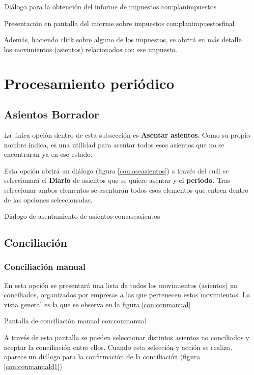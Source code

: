 {Diálogo para la obtención del informe de impuestos}
{con:planimpuestos}

{Presentación en pantalla del informe sobre impuestos}
{con:planimpuestosfinal}

Además, haciendo click sobre alguno de los impuestos, se abrirá en más detalle los movimientos (asientos) relacionados con ese impuesto.


\section{Procesamiento periódico}


\subsection{Asientos Borrador}
\label{con:asentar}
La única opción dentro de esta subsección es \textbf{Asentar asientos}. Como su propio nombre indica, es una utilidad para asentar todos esos asientos que no se encontraran ya en ese estado.

Esta opción abrirá un diálogo (figura \ref{con:aseasientos}) a través del cuál se seleccionará el \textbf{Diario} de asientos que se quiere asentar y el \textbf{periodo}. Tras seleccionar ambos elementos se asentarán todos esos elementos que entren dentro 
de las opciones seleccionadas.

{Dialogo de asentamiento de asientos}
{con:aseasientos}



\subsection{Conciliación}

\subsubsection{Conciliación manual}

En esta opción se presentará una lista de todos los movimientos (asientos) no conciliados, organizados por empresas a las que pertenecen estos movimientos. La vista general es la que se observa en la figura \ref{con:conmanual}

{Pantalla de conciliación manual}
{con:conmanual}

A través de esta pantalla se pueden seleccionar distintos asientos no conciliados y aceptar la conciliación entre ellos. Cuando esta selección y acción se realiza, aparece un diálogo para la confirmación de la conciliación (figura \ref{con:conmanuald1})

